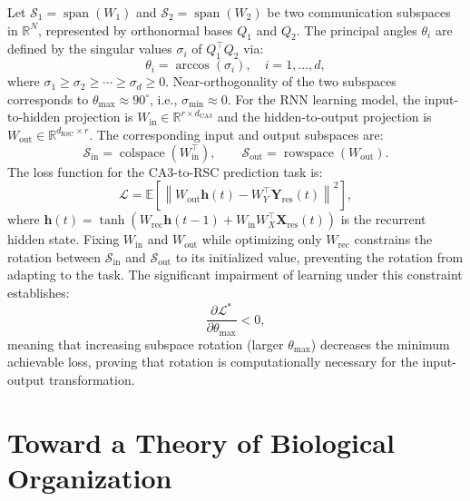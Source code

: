 \documentclass[12pt, a4paper, openany]{book}
\theoremstyle{definition}
\theoremstyle{remark}
\begin{document}
Let $\mathcal{S}_1 = \operatorname{span}(W_1)$ and $\mathcal{S}_2 = \operatorname{span}(W_2)$ be two communication subspaces in $\mathbb{R}^N$, represented by orthonormal bases $Q_1$ and $Q_2$. The principal angles $\theta_i$ are defined by the singular values $\sigma_i$ of $Q_1^\top Q_2$ via:
\begin{equation}
\theta_i = \arccos(\sigma_i), \quad i = 1, \dots, d,
\end{equation}
where $\sigma_1 \geq \sigma_2 \geq \cdots \geq \sigma_d \geq 0$. Near-orthogonality of the two subspaces corresponds to $\theta_{\max} \approx 90^\circ$, i.e., $\sigma_{\min} \approx 0$. For the RNN learning model, the input-to-hidden projection is $W_{\text{in}} \in \mathbb{R}^{r \times d_{\text{CA3}}}$ and the hidden-to-output projection is $W_{\text{out}} \in \mathbb{R}^{d_{\text{RSC}} \times r}$. The corresponding input and output subspaces are:
\begin{equation}
\mathcal{S}_{\text{in}} = \operatorname{colspace}(W_{\text{in}}^\top), \qquad \mathcal{S}_{\text{out}} = \operatorname{rowspace}(W_{\text{out}}).
\end{equation}
The loss function for the CA3-to-RSC prediction task is:
\begin{equation}
\mathcal{L} = \mathbb{E}\!\left[\left\|W_{\text{out}} \mathbf{h}(t) - W_Y^\top \mathbf{Y}_{\text{res}}(t)\right\|^2\right],
\end{equation}
where $\mathbf{h}(t) = \tanh(W_{\text{rec}}\mathbf{h}(t-1) + W_{\text{in}} W_X^\top \mathbf{X}_{\text{res}}(t))$ is the recurrent hidden state. Fixing $W_{\text{in}}$ and $W_{\text{out}}$ while optimizing only $W_{\text{rec}}$ constrains the rotation between $\mathcal{S}_{\text{in}}$ and $\mathcal{S}_{\text{out}}$ to its initialized value, preventing the rotation from adapting to the task. The significant impairment of learning under this constraint establishes:
\begin{equation}
\frac{\partial \mathcal{L}^*}{\partial \theta_{\max}} < 0,
\end{equation}
meaning that increasing subspace rotation (larger $\theta_{\max}$) decreases the minimum achievable loss, proving that rotation is computationally necessary for the input-output transformation.


\part{Toward a Theory of Biological Organization}
\end{document}
